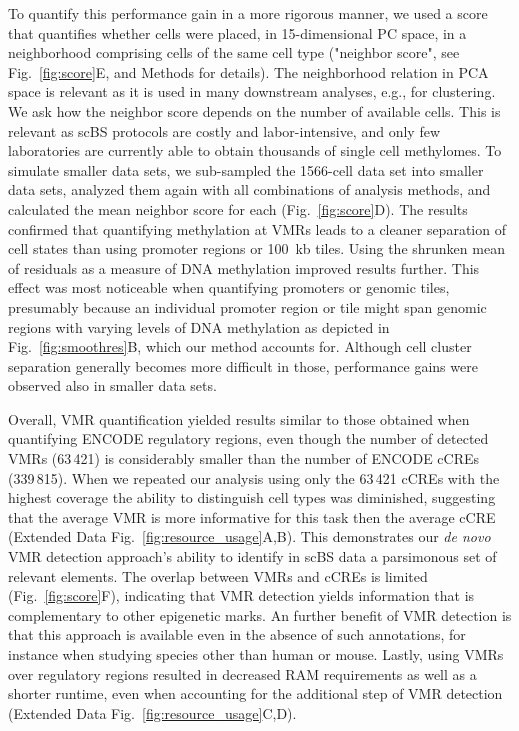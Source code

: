 \documentclass[10pt]{article}
\begin{document}
To quantify this performance gain in a more rigorous manner, we used a score that quantifies whether cells were placed, in 15-dimensional PC space, in a neighborhood comprising cells of the same cell type ("neighbor score", see Fig.~\ref{fig:score}E, and Methods for details). The neighborhood relation in PCA space is relevant as it is used in many downstream analyses, e.g., for clustering.
We ask how the neighbor score depends on the number of available cells.
This is relevant as scBS protocols are costly and labor-intensive, and only few laboratories are currently able to obtain thousands of single cell methylomes.
To simulate smaller data sets, we sub-sampled the 1566-cell data set into smaller data sets, analyzed them again with all combinations of analysis methods, and calculated the mean neighbor score for each (Fig.~\ref{fig:score}D).
The results confirmed that quantifying methylation at VMRs leads to a cleaner separation of cell states than using promoter regions or 100~kb tiles.
Using the shrunken mean of residuals as a measure of DNA methylation improved results further.
This effect was most noticeable when quantifying promoters or genomic tiles, presumably because an individual promoter region or tile might span genomic regions with varying levels of DNA methylation as depicted in Fig.~\ref{fig:smoothres}B, which our method accounts for.
Although cell cluster separation generally becomes more difficult in those, performance gains were observed also in smaller data sets.



Overall, VMR quantification yielded results similar to those obtained when quantifying ENCODE regulatory regions, even though the number of detected VMRs (63\,421) is considerably smaller than the number of ENCODE cCREs (339\,815).
When we repeated our analysis using only the 63\,421 cCREs with the highest coverage the ability to distinguish cell types was diminished, suggesting that the average VMR is more informative for this task then the average cCRE (Extended Data Fig.~\ref{fig:resource_usage}A,B).
This demonstrates our \textit{de novo} VMR detection approach's ability to identify in scBS data a parsimonous set of relevant elements. The overlap between VMRs and cCREs is limited (Fig.~\ref{fig:score}F), indicating that VMR detection yields information that is complementary to other epigenetic marks.
An further benefit of VMR detection is that this approach is available even in the absence of such annotations, for instance when studying species other than human or mouse.
Lastly, using VMRs over regulatory regions resulted in decreased RAM requirements as well as a shorter runtime, even when accounting for the additional step of VMR detection (Extended Data Fig.~\ref{fig:resource_usage}C,D).
\end{document}
